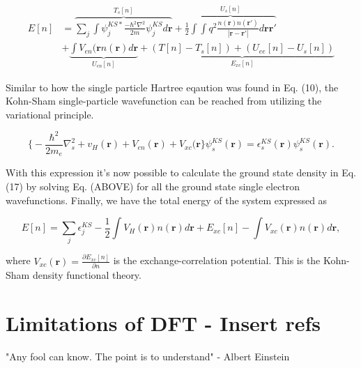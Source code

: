 \begin{equation}
    \begin{split}
    E[n] &= \overbrace{\sum_j \int \psi_j^{KS*}\frac{-\hbar^2 \nabla^2}{2m}\psi_j^{KS}d\boldsymbol{r}}^{T_s[n]} + \overbrace{\frac{1}{2} \int \int q^2 \frac{n(\boldsymbol{r})n(\boldsymbol{r}')}{|\boldsymbol{r} - \boldsymbol{r}'|}d\boldsymbol{r}\boldsymbol{r}'}^{U_s[n]} \\ 
        &+ \underbrace{\int V_{en}(\boldsymbol{r}n(\boldsymbol{r})d\boldsymbol{r}}_{U_{en}[n]} + \underbrace{(T[n] - T_s[n]) + (U_{ee}[n] - U_s[n])}_{E_{xc}[n]}
    \end{split}
\end{equation}

Similar to how the single particle Hartree eqaution was found in Eq. (10), the Kohn-Sham single-particle wavefunction can be reached from utilizing the variational principle.

\begin{equation}
    \bigg\{ -\frac{\hbar^2}{2m_e}\nabla^2_s + v_H(\boldsymbol{r}) + V_{en}(\boldsymbol{r}) + V_{xc}(\boldsymbol{r} \bigg\}\psi_s^{KS}(\boldsymbol{r}) = \epsilon_s^{KS}(\boldsymbol{r})\psi_s^{KS}(\boldsymbol{r}).
\end{equation}

With this expression it's now possible to calculate the ground state density in Eq. (17) by solving Eq. (ABOVE) for all the ground state single electron wavefunctions. Finally, we have the total energy of the system expressed as

\begin{equation}
E[n] = \sum_j \epsilon_j^{KS} - \frac{1}{2} \int V_H(\boldsymbol{r})n(\boldsymbol{r})d\boldsymbol{r} + E_{xc}[n] - \int V_{xc}(\boldsymbol{r})n(\boldsymbol{r})d\boldsymbol{r}, 
\end{equation}

where $V_{xc}(\boldsymbol{r}) = \frac{\partial E_{xc}[n]}{\partial n}$ is the exchange-correlation potential. This is the Kohn-Sham density functional theory.
 
 

\section{Limitations of DFT - Insert refs}

"Any fool can know. The point is to understand" - Albert Einstein \\

